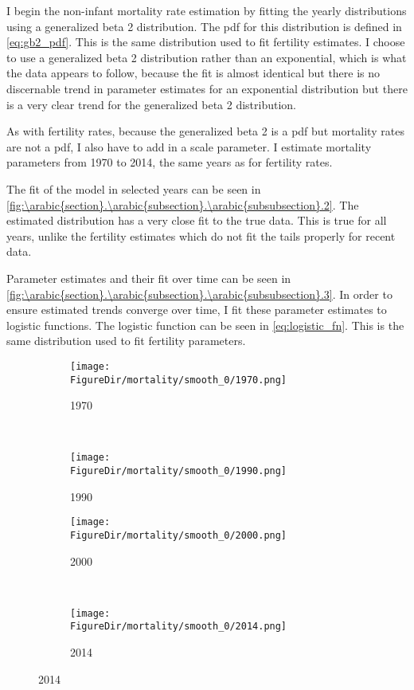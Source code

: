 \documentclass[10pt]{article}
\renewcommand{\thesection}{\arabic{section}}
\renewcommand{\thesubsection}{\thesection.\arabic{subsection}}
\renewcommand{\thesubsubsection}{\thesubsection.\arabic{subsubsection}}
\numberwithin{equation}{subsection}
\newcommand*{\FigureDir}{../../graphs}
\begin{document}
\par I begin the non-infant mortality rate estimation by fitting the yearly distributions using a generalized beta 2 distribution. The pdf for this distribution is defined in \ref{eq:gb2_pdf}. This is the same distribution used to fit fertility estimates. I choose to use a generalized beta 2 distribution rather than an exponential, which is what the data appears to follow, because the fit is almost identical but there is no discernable trend in parameter estimates for an exponential distribution but there is a very clear trend for the generalized beta 2 distribution.

\par As with fertility rates, because the generalized beta 2 is a pdf but mortality rates are not a pdf, I also have to add in a scale parameter. I estimate mortality parameters from 1970 to 2014, the same years as for fertility rates.

\par The fit of the model in selected years can be seen in \autoref{fig:\thesubsubsection.2}. The estimated distribution has a very close fit to the true data. This is true for all years, unlike the fertility estimates which do not fit the tails properly for recent data.

\par Parameter estimates and their fit over time can be seen in \autoref{fig:\thesubsubsection.3}. In order to ensure estimated trends converge over time, I fit these parameter estimates to logistic functions. The logistic function can be seen in \ref{eq:logistic_fn}. This is the same distribution used to fit fertility parameters.

\begin{figure}[!ht]
   \centering
   \caption{\label{fig:\thesubsubsection.2}Mortality Estimated by Generalized Beta 2}
   \begin{subfigure}{0.5\textwidth}
      \centering
      \texttt{[image: \\FigureDir/mortality/smooth\_0/1970.png]}
      \caption{1970}
   \end{subfigure}%
   ~ %
   \begin{subfigure}{0.5\textwidth}
      \centering
      \texttt{[image: \\FigureDir/mortality/smooth\_0/1990.png]}
      \caption{1990}
   \end{subfigure}%
   \newline
   \begin{subfigure}{0.5\textwidth}
      \centering
      \texttt{[image: \\FigureDir/mortality/smooth\_0/2000.png]}
      \caption{2000}
   \end{subfigure}%
   ~ %
   \begin{subfigure}{0.5\textwidth}
      \centering
      \texttt{[image: \\FigureDir/mortality/smooth\_0/2014.png]}
      \caption{2014}
   \end{subfigure}%
\end{figure}
\end{document}
